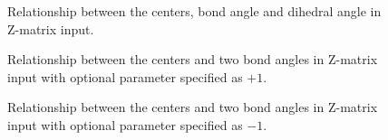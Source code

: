 \begin{figure}[htbp]
\centering
{}

\caption{\label{fig:zmat1} Relationship between the centers, bond angle
and dihedral angle in Z-matrix input.}
\end{figure}

\begin{figure}[htbp]
\centering
{}

\caption{\label{fig:zmat2} Relationship between the centers and two
  bond angles in Z-matrix input with optional parameter specified as $+1$.}
\end{figure}

\begin{figure}[htbp]
\centering
{}

\caption{\label{fig:zmat3} Relationship between the centers and two
  bond angles in Z-matrix input with optional parameter specified as $-1$.}
\end{figure}

